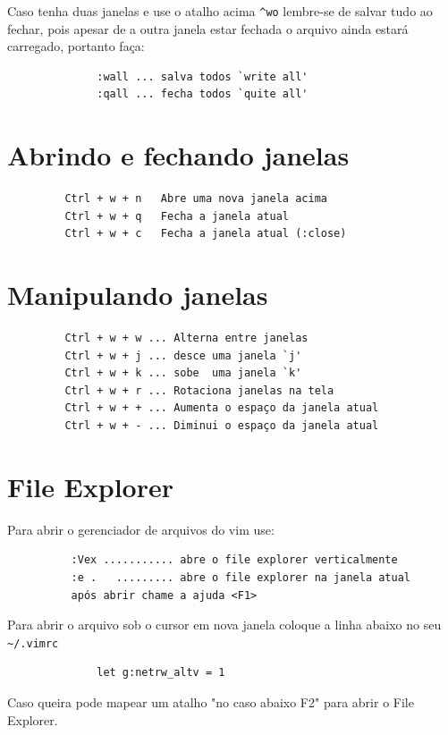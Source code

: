 \documentclass[10pt,a4paper,openany]{book}
\begin{document}
Caso tenha duas janelas e use o atalho acima \verb|^wo| lembre-se de salvar
tudo ao fechar, pois apesar de a outra janela estar fechada o arquivo
ainda estará carregado, portanto faça:

\begin{verbatim}
			  :wall ... salva todos `write all'
			  :qall ... fecha todos `quite all'
\end{verbatim}

\section{Abrindo e fechando janelas }

\begin{verbatim}
		 Ctrl + w + n   Abre uma nova janela acima
		 Ctrl + w + q   Fecha a janela atual
		 Ctrl + w + c   Fecha a janela atual (:close)
\end{verbatim}

\section{Manipulando janelas }

\begin{verbatim}
		 Ctrl + w + w ... Alterna entre janelas
		 Ctrl + w + j ... desce uma janela `j'
		 Ctrl + w + k ... sobe  uma janela `k'
		 Ctrl + w + r ... Rotaciona janelas na tela
		 Ctrl + w + + ... Aumenta o espaço da janela atual
		 Ctrl + w + - ... Diminui o espaço da janela atual
\end{verbatim}

\section{File Explorer }
\label{File Explorer }
Para abrir o gerenciador de arquivos do vim use:

\begin{verbatim}
		  :Vex ........... abre o file explorer verticalmente
		  :e .   ......... abre o file explorer na janela atual
		  após abrir chame a ajuda <F1>
\end{verbatim}

Para abrir o arquivo sob o cursor em nova janela coloque a linha abaixo no seu \verb|~/.vimrc|

\begin{verbatim}
			  let g:netrw_altv = 1
\end{verbatim}

Caso queira pode mapear um atalho "no caso abaixo F2" para abrir o File Explorer.
\end{document}

